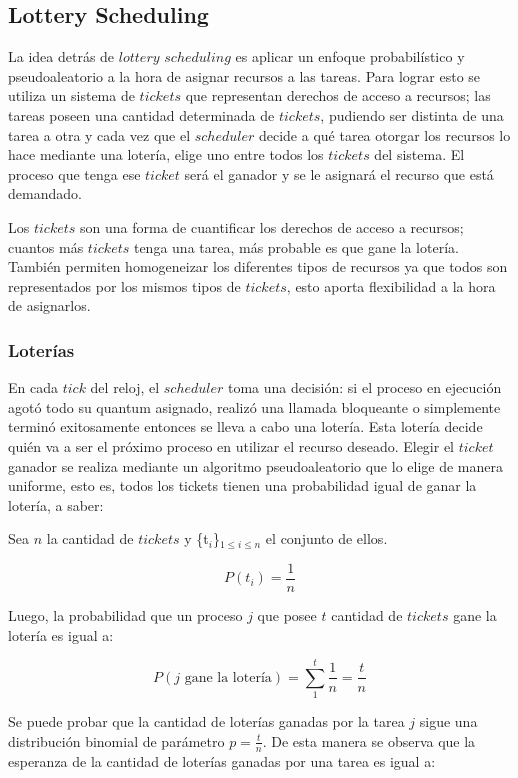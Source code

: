 \subsection{Lottery Scheduling}

La idea detr\'as de $lottery$ $scheduling$\cite{SchedLottery} es aplicar un enfoque probabil\'istico y pseudoaleatorio a la hora de asignar recursos a las tareas. Para lograr esto se utiliza un sistema de $tickets$ que representan derechos de acceso a recursos; las tareas poseen una cantidad determinada de $tickets$, pudiendo ser distinta de una tarea a otra y cada vez que el $scheduler$ decide a qu\'e tarea otorgar los recursos lo hace mediante una loter\'ia, elige uno entre todos los $tickets$ del sistema. El proceso que tenga ese $ticket$ ser\'a el ganador y se le asignar\'a el recurso que est\'a demandado.

Los $tickets$ son una forma de cuantificar los derechos de acceso a recursos; cuantos m\'as $tickets$ tenga una tarea, m\'as probable es que gane la loter\'ia. Tambi\'en permiten homogeneizar los diferentes tipos de recursos ya que todos son representados por los mismos tipos de $tickets$, esto aporta flexibilidad a la hora de asignarlos.

\subsubsection{Loter\'ias}

En cada $tick$ del reloj, el $scheduler$ toma una decisi\'on: si el proceso en ejecuci\'on agot\'o todo su quantum asignado, realiz\'o una llamada bloqueante o simplemente termin\'o exitosamente entonces se lleva a cabo una loter\'ia. Esta loter\'ia decide qui\'en va a ser el pr\'oximo proceso en utilizar el recurso deseado. Elegir el $ticket$ ganador se realiza mediante un algoritmo pseudoaleatorio que lo elige de manera uniforme, esto es, todos los tickets tienen una probabilidad igual de ganar la loter\'ia, a saber:

Sea $n$ la cantidad de $tickets$ y \{t$_i$\}$_{1 \leq i \leq n}$ el conjunto de ellos.

\[
	P(t_{i}) = \frac{1}{n}
\]

Luego, la probabilidad que un proceso $j$ que posee $t$ cantidad de $tickets$ gane la loter\'ia es igual a:


\[
	P(j \text{ gane la loter\'ia}) = \sum_{1}^{t}\frac{1}{n} = \frac{t}{n}
\]

Se puede probar que la cantidad de loter\'ias ganadas por la tarea $j$ sigue una distribuci\'on binomial de par\'ametro $p = \frac{t}{n}$. De esta manera se observa que la esperanza de la cantidad de loter\'ias ganadas por una tarea es igual a:

